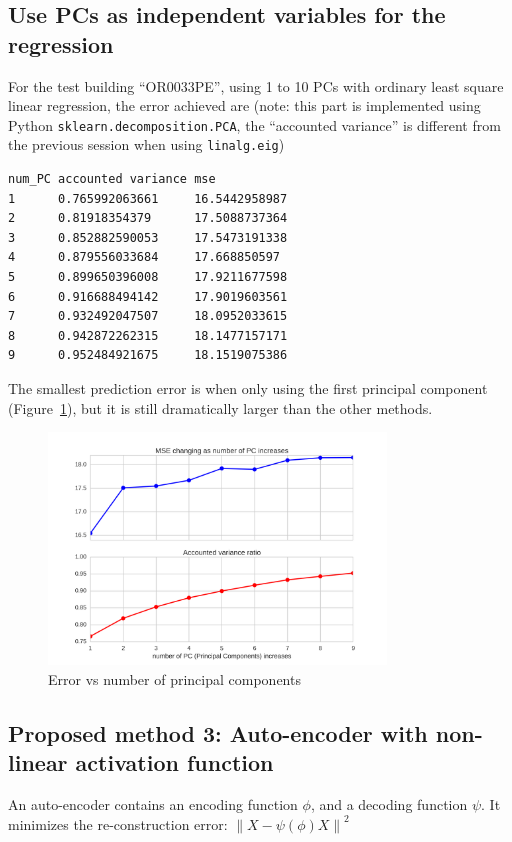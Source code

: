 \documentclass[12pt]{article}
\newcommand{\fref}[1]{Figure~\ref{#1}}
\begin{document}
\subsection{Use PCs as independent variables for the regression}
For the test building ``OR0033PE'', using 1 to 10 PCs with ordinary least square linear regression, the error achieved are (note: this part is implemented using Python \texttt{sklearn.decomposition.PCA}, the ``accounted variance'' is different from the previous session when using \texttt{linalg.eig})
\begin{verbatim}
num_PC accounted variance mse
1      0.765992063661     16.5442958987
2      0.81918354379      17.5088737364
3      0.852882590053     17.5473191338
4      0.879556033684     17.668850597
5      0.899650396008     17.9211677598
6      0.916688494142     17.9019603561
7      0.932492047507     18.0952033615
8      0.942872262315     18.1477157171
9      0.952484921675     18.1519075386
\end{verbatim}
The smallest prediction error is when only using the first principal
component (\fref{fig:pca_err_pc}), but it is still dramatically larger
than the other methods.
\begin{figure}[h]
  \centering
  \includegraphics[width=0.8\textwidth]{images/pca_err_pc.png}
  \caption{Error vs number of principal components}
  \label{fig:pca_err_pc}
\end{figure}
\FloatBarrier

\subsection{Proposed method 3: Auto-encoder with non-linear activation function}
An auto-encoder contains an encoding function $\phi$, and a decoding
function $\psi$. It minimizes the re-construction error:
$\left\|X - \psi(\phi)X\right\|^2$
\end{document}
